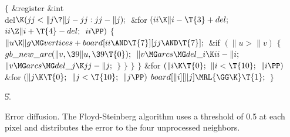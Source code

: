 ${}\{{}$\5
\1\&{register} \&{int} \\{del}${}\K(\\{jj}<\|j\?\|j-\\{jj}:\\{jj}-\|j);{}$\7
\&{for} ${}(\\{ii}\K\|i-\T{3}+\\{del};{}$ ${}\\{ii}\Z\|i+\T{4}-\\{del};{}$ ${}%
\\{ii}\PP){}$\5
${}\{{}$\1\6
${}\|u\K\|g\MG\\{vertices}+\\{board}[\\{ii}\AND\T{7}][\\{jj}\AND\T{7}];{}$\6
\&{if} ${}(\|u>\|v){}$\5
${}\{{}$\1\6
${}\\{gb\_new\_arc}(\|v,\39\|u,\39\T{0});{}$\6
${}\|v\MG\\{arcs}\MG\\{del\_i}\K\\{ii}-\|i;{}$\6
${}\|v\MG\\{arcs}\MG\\{del\_j}\K\\{jj}-\|j;{}$\6
\4${}\}{}$\2\6
\4${}\}{}$\2\6
\4${}\}{}$\2\6
\4${}\}{}$\2\6
\&{for} ${}(\|i\K\T{0};{}$ ${}\|i<\T{10};{}$ ${}\|i\PP){}$\1\6
\&{for} ${}(\|j\K\T{0};{}$ ${}\|j<\T{10};{}$ ${}\|j\PP){}$\1\5
${}\\{board}[\|i][\|j]\MRL{{\GG}{\K}}\T{1};{}$\2\2\6
\4${}\}{}$\2\par
\U5.\fi

Error diffusion. The Floyd-Steinberg algorithm uses a
threshold of
0.5 at each pixel and distributes the error to the four unprocessed
neighbors.

